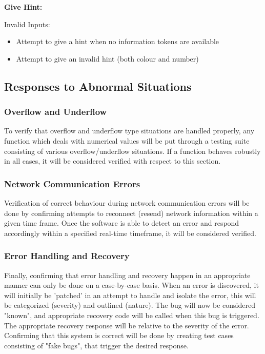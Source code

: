 \documentclass[12pt]{article}
\begin{document}
\begin{description}
\item
\begin{description}
	\item \textbf{Give Hint:}
	\item Invalid Inputs:
		\begin{itemize}
		\item Attempt to give a hint when no information tokens are available
		\item Attempt to give an invalid hint (both colour and number)
		\end{itemize}	
\end{description}	
\end{description}

\subsection{Responses to Abnormal Situations}

\subsubsection{Overflow and Underflow}
To verify that overflow and underflow type situations are handled properly,
any function which deals with numerical values will be put through a testing
suite consisting of various overflow/underflow situations.  If a function
behaves robustly in all cases, it will be considered verified with respect to this section.
\subsubsection{Network Communication Errors}
Verification of correct behaviour during network communication errors will be
done by confirming attempts to reconnect (resend) network information within
a given time frame. Once the software is able to detect an error and respond
accordingly within a specified real-time timeframe, it will be considered
verified.
\subsubsection{Error Handling and Recovery}
Finally, confirming that error handling and recovery happen in an appropriate
manner can only be done on a case-by-case basis.  When an error is discovered,
it will initially be 'patched' in an attempt to handle and isolate the error,
this will be categorized (severity) and outlined (nature).  The bug will now
be considered "known", and appropriate recovery code will be called when this bug
is triggered.  The appropriate recovery response will be relative to the 
severity of the error.  Confirming that this system is correct will be done by
creating test cases consisting of "fake bugs", that trigger the desired response.
\end{document}
